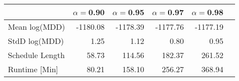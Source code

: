 \begin{tabular} {lrrrrr} 
 \hline \hline 
&$\alpha = $0.90&$\alpha = $0.95&$\alpha = $0.97&$\alpha = $0.98\\ 
 \hline 
Mean log(MDD)&-1180.08&-1178.39&-1177.76&-1177.19\\ 
StdD log(MDD)&1.25&1.12&0.80&0.95\\ 
Schedule Length&58.73&114.56&182.37&261.52\\ 
Runtime [Min]&80.21&158.10&256.27&368.94\\ 
\hline 
\end{tabular}